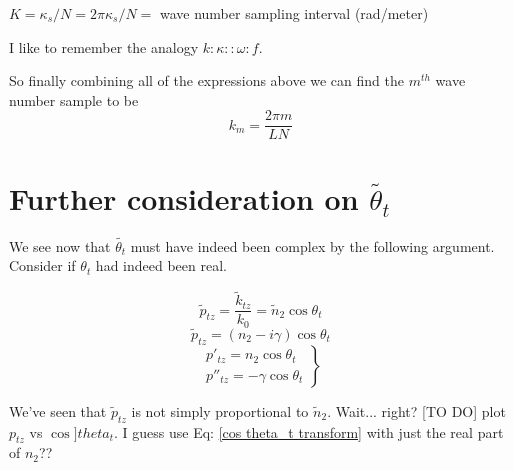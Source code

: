 \documentclass[10pt,a4paper]{article}
\begin{document}
$K = \kappa_s/N = 2\pi\kappa_s/N =$ wave number sampling interval (rad/meter)

I like to remember the analogy $k:\kappa::\omega:f$.

So finally combining all of the expressions above we can find the $m^{th}$ wave number sample to be
\begin{equation}
k_m=\frac{2\pi m}{LN}
\end{equation}

\appendix

\section{Further consideration on $\tilde{\theta_t}$}
We see now that $\tilde{\theta_t}$ must have indeed been complex by the following argument.  Consider if $\theta_t$ had indeed been real.

\begin{equation}
\tilde{p}_{tz} = \frac{\tilde{k}_{tz}}{k_0} = \tilde{n}_2\cos\theta_t
\end{equation}
\begin{equation}
\tilde{p}_{tz} = (n_2 - i\gamma) \cos\theta_t
\end{equation}
\begin{equation}
\left.
\begin{aligned}
p'_{tz}=n_2\cos\theta_t \\
p''_{tz}=-\gamma\cos\theta_t
\end{aligned}
\right\}
\end{equation}

We've seen that $\tilde{p}_{tz}$ is not simply proportional to $\tilde{n}_2$. Wait... right?  [TO DO] plot $p_{tz}$ vs $\cos]theta_t$. I guess use Eq: \ref{cos theta_t transform} with just the real part of $n_2$??
\end{document}
